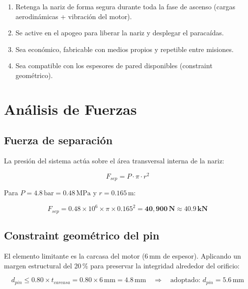 \documentclass[11pt, a4paper]{article}
\begin{document}
\begin{enumerate}[leftmargin=*, itemsep=3pt]
  \item Retenga la nariz de forma segura durante toda la fase de ascenso (cargas aerodinámicas + vibración del motor).
  \item Se active en el apogeo para liberar la nariz y desplegar el paracaídas.
  \item Sea económico, fabricable con medios propios y repetible entre misiones.
  \item Sea compatible con los espesores de pared disponibles (constraint geométrico).
\end{enumerate}

\section{Análisis de Fuerzas}

\subsection{Fuerza de separación}

La presión del sistema actúa sobre el área transversal interna de la nariz:

\begin{equation}
  F_{sep} = P \cdot \pi \cdot r^2
\end{equation}

Para $P = 4.8\,\text{bar} = 0.48\,\text{MPa}$ y $r = 0.165\,\text{m}$:

\begin{equation}
  F_{sep} = 0.48 \times 10^6 \times \pi \times 0.165^2 = \mathbf{40{,}900\,\text{N} \approx 40.9\,\text{kN}}
\end{equation}

\subsection{Constraint geométrico del pin}

El elemento limitante es la carcasa del motor (6\,mm de espesor). Aplicando un margen estructural del 20\,\% para preservar la integridad alrededor del orificio:

\begin{equation}
  d_{pin} \leq 0.80 \times t_{carcasa} = 0.80 \times 6\,\text{mm} = 4.8\,\text{mm}
  \quad \Rightarrow \quad \text{adoptado: } d_{pin} = 5.6\,\text{mm}
\end{equation}
\end{document}
